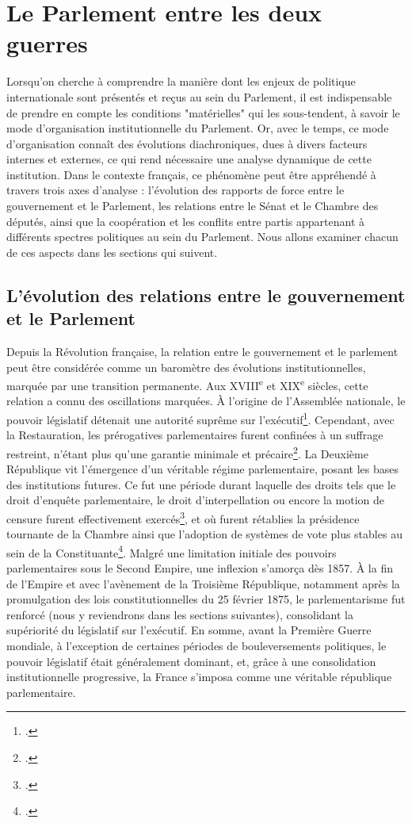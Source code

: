 \documentclass[a4paper,twoside,12pt]{book}
\begin{document}
\section{Le Parlement entre les deux guerres}
Lorsqu'on cherche à comprendre la manière dont les enjeux de politique internationale sont présentés et reçus au sein du Parlement, il est indispensable de prendre en compte les conditions "matérielles" qui les sous-tendent, à savoir le mode d'organisation institutionnelle du Parlement. Or, avec le temps, ce mode d'organisation connaît des évolutions diachroniques, dues à divers facteurs internes et externes, ce qui rend nécessaire une analyse dynamique de cette institution. Dans le contexte français, ce phénomène peut être appréhendé à travers trois axes d'analyse : l'évolution des rapports de force entre le gouvernement et le Parlement, les relations entre le Sénat et le Chambre des députés, ainsi que la coopération et les conflits entre partis appartenant à différents spectres politiques au sein du Parlement. Nous allons examiner chacun de ces aspects dans les sections qui suivent.

\subsection{L'évolution des relations entre le gouvernement et le Parlement}
Depuis la Révolution française, la relation entre le gouvernement et le parlement peut être considérée comme un baromètre des évolutions institutionnelles, marquée par une transition permanente.
Aux XVIII\textsuperscript{e} et XIX\textsuperscript{e} siècles, cette relation a connu des oscillations marquées. À l'origine de l'Assemblée nationale, le pouvoir législatif détenait une autorité suprême sur l'exécutif\footcite[p.37]{morel2024}. Cependant, avec la Restauration, les prérogatives parlementaires furent confinées à un suffrage restreint, n'étant plus qu'une garantie minimale et précaire\footcite[p.125]{morel2024}. La Deuxième République vit l'émergence d'un véritable régime parlementaire, posant les bases des institutions futures. Ce fut une période durant laquelle des droits tels que le droit d'enquête parlementaire, le droit d'interpellation ou encore la motion de censure furent effectivement exercés\footcite[p.154]{morel2024}, et où furent rétablies la présidence tournante de la Chambre ainsi que l'adoption de systèmes de vote plus stables au sein de la Constituante\footcite[p.157]{morel2024}.
Malgré une limitation initiale des pouvoirs parlementaires sous le Second Empire, une inflexion s'amorça dès 1857. À la fin de l'Empire et avec l'avènement de la Troisième République, notamment après la promulgation des lois constitutionnelles du 25 février 1875, le parlementarisme fut renforcé (nous y reviendrons dans les sections suivantes), consolidant la supériorité du législatif sur l'exécutif. En somme, avant la Première Guerre mondiale, à l'exception de certaines périodes de bouleversements politiques, le pouvoir législatif était généralement dominant, et, grâce à une consolidation institutionnelle progressive, la France s'imposa comme une véritable république parlementaire.
\end{document}
